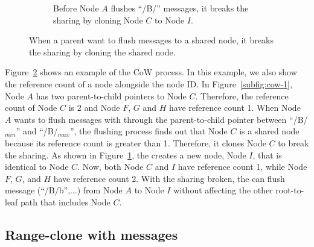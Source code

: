 \begin{figure}
\begin{subfigure}{\textwidth}
        \caption{\label{subfig:cow-2} Before Node $A$ flushes ``/B/'' messages,
        it breaks the sharing by cloning Node $C$ to Node $I$.}
    \end{subfigure}
    \caption[\bedags break node sharing with CoW]{\label{fig:cow}
        When a parent want to flush messages to a shared node,
        it breaks the sharing by cloning the shared node.}
\end{figure}

Figure~\ref{fig:cow} shows an example of the CoW process.
In this example, we also show the reference count of a node alongside the node
ID.
In Figure~\ref{subfig:cow-1}, Node $A$ has two parent-to-child pointers to
Node $C$.
Therefore, the reference count of Node $C$ is 2 and
Node $F$, $G$ and $H$ have reference count 1.
When Node $A$ wants to flush messages with through the parent-to-child pointer
between ``/B/$_{min}$'' and ``/B/$_{max}$'',
the flushing process finds out that Node $C$ is a shared node because its
reference count is greater than 1.
Therefore, it clones Node $C$ to break the sharing.
As shown in Figure~\ref{subfig:cow-2}, the \bedag creates a new node, Node $I$,
that is identical to Node $C$.
Now, both Node $C$ and $I$ have reference count 1, while Node $F$, $G$, and
$H$ have reference count 2.
With the sharing broken, the \bedag can flush message \putm(``/B/b'',...) from
Node $A$ to Node $I$ without affecting the other root-to-leaf path that
includes Node $C$.

\subsection{Range-clone with \goto messages}
\label{sec:rc:goto}

